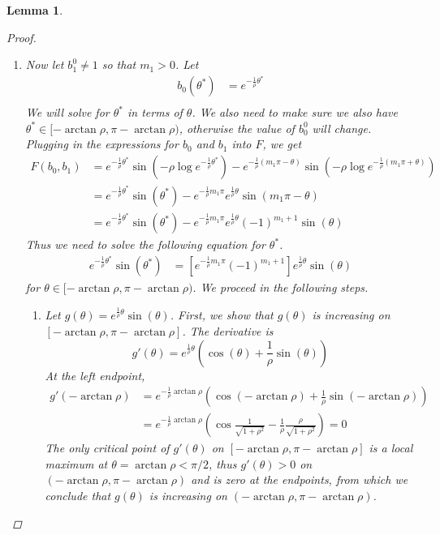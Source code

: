 \documentclass[12pt]{article}
\newtheorem{lemma}{Lemma}
\begin{document}
\begin{lemma}
\begin{proof}
\begin{enumerate}
	\item Now let $b_1^0 \neq 1$ so that $m_1 > 0$. Let
	\begin{align*}
	b_0(\theta^*) &= e^{-\frac{1}{\rho} \theta^* } \\
	\end{align*}
	We will solve for $\theta^*$ in terms of $\theta$. We also need to make sure we also have $\theta^* \in [-\arctan \rho,\pi - \arctan \rho)$, otherwise the value of $b_0^0$ will change. Plugging in the expressions for $b_0$ and $b_1$ into $F$, we get
	\begin{align*}
	F(b_0, b_1) &= e^{ -\frac{1}{\rho}\theta^* } \sin\left( -\rho \log e^{ -\frac{1}{\rho}\theta^* }\right) - e^{ -\frac{1}{\rho}(m_1 \pi - \theta) }\sin \left( -\rho \log e^{ -\frac{1}{\rho}(m_1 \pi + \theta) } \right) \\
	&= e^{ -\frac{1}{\rho}\theta^* } \sin\left( \theta^* \right) - e^{ -\frac{1}{\rho} m_1 \pi} e^{ \frac{1}{\rho} \theta } \sin(m_1 \pi - \theta) \\
	&= e^{ -\frac{1}{\rho}\theta^* } \sin\left( \theta^* \right) - e^{ -\frac{1}{\rho} m_1 \pi } e^{ \frac{1}{\rho} \theta } (-1)^{m_1 + 1} \sin(\theta)
	\end{align*}
	Thus we need to solve the following equation for $\theta^*$.
	\begin{align}\label{thetastareq}
	e^{ -\frac{1}{\rho}\theta^* } \sin\left( \theta^* \right) &= \left[ e^{ -\frac{1}{\rho} m_1 \pi } (-1)^{m_1 + 1} \right] e^{ \frac{1}{\rho} \theta } \sin(\theta)
	\end{align}
	for $\theta \in [-\arctan \rho,\pi - \arctan \rho)$. We proceed in the following steps.
	\begin{enumerate}
		\item Let $g(\theta) = e^{ \frac{1}{\rho} \theta } \sin(\theta)$. First, we show that $g(\theta)$ is increasing on $[-\arctan \rho,\pi - \arctan \rho]$. The derivative is 
		\[
		g'(\theta) = e^{ \frac{1}{\rho} \theta } \left( \cos(\theta) + \frac{1}{\rho} \sin(\theta)\right)
		\]
		At the left endpoint,
		\begin{align*}
		g'(-\arctan \rho) &= e^{ -\frac{1}{\rho} \arctan \rho } \left(\cos(-\arctan \rho) + \frac{1}{\rho} \sin(-\arctan \rho)\right) \\
		&= e^{ -\frac{1}{\rho} \arctan \rho } \left(\cos\frac{1}{\sqrt{1 + \rho^2}} - \frac{1}{\rho} \frac{\rho}{\sqrt{1 + \rho^2}}\right) = 0
		\end{align*}
		The only critical point of $g'(\theta)$ on $[-\arctan \rho,\pi - \arctan \rho]$ is a local maximum at $\theta = \arctan \rho < \pi/2$, thus $g'(\theta) > 0$ on $(-\arctan \rho,\pi - \arctan \rho)$ and is zero at the endpoints, from which we conclude that $g(\theta)$ is increasing on $(-\arctan \rho,\pi - \arctan \rho)$.
		

\end{enumerate}
\end{enumerate}
\end{proof}
\end{lemma}
\end{document}
